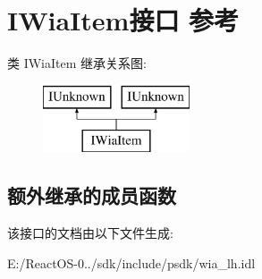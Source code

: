 \hypertarget{interface_i_wia_item}{}\section{I\+Wia\+Item接口 参考}
\label{interface_i_wia_item}
类 I\+Wia\+Item 继承关系图\+:\begin{figure}[H]
\begin{center}
\leavevmode
\includegraphics[height=2.000000cm]{interface_i_wia_item}
\end{center}
\end{figure}
\subsection*{额外继承的成员函数}


该接口的文档由以下文件生成\+:\begin{DoxyCompactItemize}
\item 
E\+:/\+React\+O\+S-\/0../sdk/include/psdk/wia\+\_\+lh.\+idl\end{DoxyCompactItemize}
